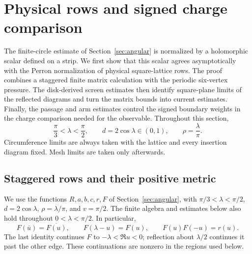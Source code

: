 \section{Physical rows and signed charge comparison}\label{sec:physical}

The finite-circle estimate of Section~\ref{sec:angular} is normalized
by a holomorphic scalar defined on a strip. We first show that this
scalar agrees asymptotically with the Perron normalization of physical
square-lattice rows. The proof combines a staggered finite matrix
calculation with the periodic six-vertex pressure. The disk-derived
screen estimates then identify square-plane limits of the reflected
diagrams and turn the matrix bounds into current estimates. Finally,
the passage and arm estimates control the signed boundary weights in
the charge comparison needed for the observable. Throughout this section,
\[
  \frac{\pi}{3}<\lambda<\frac{\pi}{2},\qquad
  d=2\cos\lambda\in(0,1),\qquad \rho=\frac{\lambda}{\pi}.
\]
Circumference limits are always taken with the lattice and every
insertion diagram fixed. Mesh limits are taken only afterwards.

\subsection{Staggered rows and their positive metric}
\label{physical:staggered-rows}

We use the functions $R,a,b,c,r,F$ of Section~\ref{sec:angular}, with
$\pi/3<\lambda<\pi/2$, $d=2\cos\lambda$, $\rho=\lambda/\pi$, and $v=\pi/2$.
The finite algebra and estimates below also hold throughout
$0<\lambda<\pi/2$.
In particular,
\begin{equation}\label{physical:F-identities}
 F(\overline u)=\overline{F(u)},\qquad
 F(\lambda-u)=F(u),\qquad F(u)F(-u)=r(u).
\end{equation}
The last identity continues $F$ to $-\lambda<\Re u<0$; reflection about
$\lambda/2$ continues it past the other edge. These continuations are
nonzero in the regions used below.

